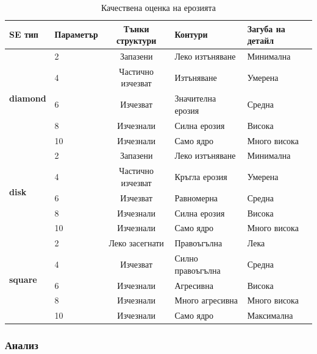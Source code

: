 \begin{table}[H]
\centering
\caption{Качествена оценка на ерозията}
\begin{tabular}{llcll}
\toprule
\textbf{SE тип} & \textbf{Параметър} & \textbf{Тънки структури} & \textbf{Контури} & \textbf{Загуба на детайл} \\
\midrule
\multirow{5}{*}{\textbf{diamond}} & 2  & Запазени         & Леко изтъняване   & Минимална \\
                                   & 4  & Частично изчезват & Изтъняване       & Умерена \\
                                   & 6  & Изчезват          & Значителна ерозия & Средна \\
                                   & 8  & Изчезнали         & Силна ерозия      & Висока \\
                                   & 10 & Изчезнали         & Само ядро         & Много висока \\
\midrule
\multirow{5}{*}{\textbf{disk}}    & 2  & Запазени          & Леко изтъняване   & Минимална \\
                                   & 4  & Частично изчезват & Кръгла ерозия     & Умерена \\
                                   & 6  & Изчезват          & Равномерна        & Средна \\
                                   & 8  & Изчезнали         & Силна ерозия      & Висока \\
                                   & 10 & Изчезнали         & Само ядро         & Много висока \\
\midrule
\multirow{5}{*}{\textbf{square}}  & 2  & Леко засегнати    & Правоъгълна       & Лека \\
                                   & 4  & Изчезват          & Силно правоъгълна & Средна \\
                                   & 6  & Изчезнали         & Агресивна         & Висока \\
                                   & 8  & Изчезнали         & Много агресивна   & Много висока \\
                                   & 10 & Изчезнали         & Само ядро         & Максимална \\
\bottomrule
\end{tabular}
\end{table}

\subsubsection{Анализ}

